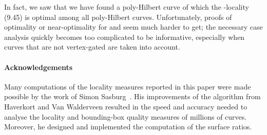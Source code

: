 \documentclass[11pt,a4paper]{article}
\begin{document}
In fact, we saw that we have found a poly-Hilbert curve of which the -locality (9.45) is optimal among all poly-Hilbert curves. Unfortunately, proofs of optimality or near-optimality for  and  seem much harder to get; the necessary case analysis quickly becomes too complicated to be informative, especially when curves that are not vertex-gated are taken into account.



\paragraph*{Acknowledgements}
Many computations of the locality measures reported in this paper were made possible by the work of Simon Sasburg~\cite{Sasburg}. His improvements of the algorithm from Haverkort and Van Walderveen resulted in the speed and accuracy needed to analyse the locality and bounding-box quality measures of millions of curves. Moreover, he designed and implemented the computation of the surface ratios.


\end{document}
